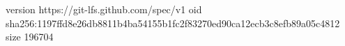 version https://git-lfs.github.com/spec/v1
oid sha256:1197ffd8e26db8811b4ba54155b1fc2f83270ed90ca12ecb3c8efb89a05c4812
size 196704
